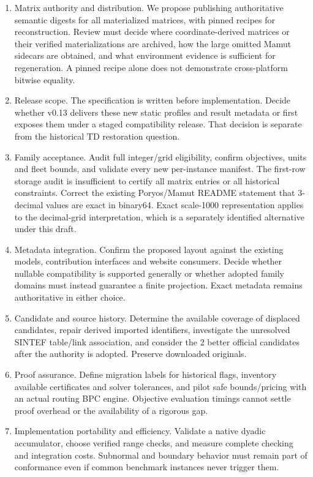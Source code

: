 \begin{enumerate}
\item Matrix authority and distribution. We propose publishing authoritative semantic digests for all materialized matrices, with pinned recipes for reconstruction. Review must decide where coordinate-derived matrices or their verified materializations are archived, how the large omitted Mamut sidecars are obtained, and what environment evidence is sufficient for regeneration. A pinned recipe alone does not demonstrate cross-platform bitwise equality.
\item Release scope. The specification is written before implementation. Decide whether v0.13 delivers these new static profiles and result metadata or first exposes them under a staged compatibility release. That decision is separate from the historical TD restoration question.
\item Family acceptance. Audit full integer/grid eligibility, confirm objectives, units and fleet bounds, and validate every new per-instance manifest. The first-row storage audit is insufficient to certify all matrix entries or all historical constraints. Correct the existing Poryos/Mamut README statement that 3-decimal values are exact in binary64. Exact scale-1000 representation applies to the decimal-grid interpretation, which is a separately identified alternative under this draft.
\item Metadata integration. Confirm the proposed  layout against the existing models, contribution interfaces and website consumers. Decide whether nullable compatibility  is supported generally or whether adopted family domains must instead guarantee a finite projection. Exact metadata remains authoritative in either choice.
\item Candidate and source history. Determine the available coverage of displaced candidates, repair derived imported identifiers, investigate the unresolved SINTEF table/link association, and consider the 2 better official candidates after the authority is adopted. Preserve downloaded originals.
\item Proof assurance. Define migration labels for historical  flags, inventory available certificates and solver tolerances, and pilot safe bounds/pricing with an actual routing BPC engine. Objective evaluation timings cannot settle proof overhead or the availability of a rigorous gap.
\item Implementation portability and efficiency. Validate a native dyadic accumulator, choose verified range checks, and measure complete checking and integration costs. Subnormal and boundary behavior must remain part of conformance even if common benchmark instances never trigger them.
\end{enumerate}

